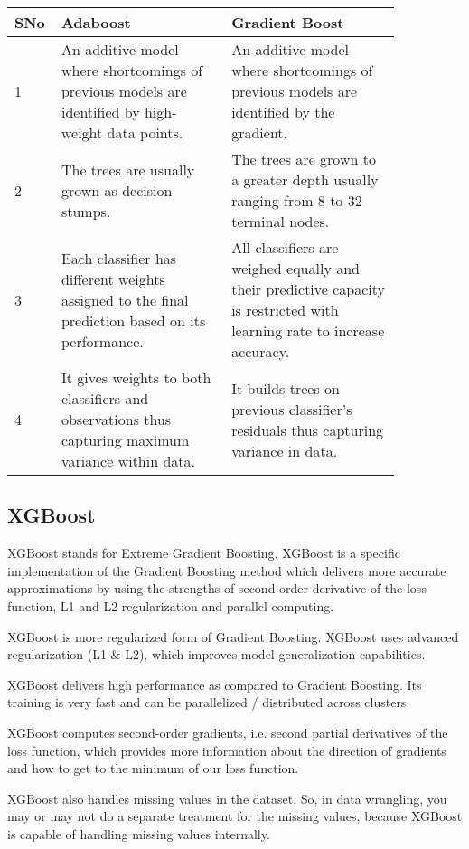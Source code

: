 \documentclass{article}
\begin{document}
\begin{table}[hbt]
\begin{tabular}{p{0.05\linewidth} | p{0.4\linewidth} | p{0.4\linewidth}}
\hline
SNo & Adaboost & Gradient Boost \\
\hline
1&  An additive model where shortcomings of previous models are identified by high-weight data points. &  An additive model where shortcomings of previous models are identified by the gradient.  \\
 2&  The trees are usually grown as decision stumps. &  The trees are grown to a greater depth usually ranging from 8 to 32 terminal nodes.  \\
 3&  Each classifier has different weights assigned to the final prediction based on its performance. &   All classifiers are weighed equally and their predictive capacity is restricted with learning rate to increase accuracy. \\
 4&  It gives weights to both classifiers and observations thus capturing maximum variance within data. &  It builds trees on previous classifier's residuals thus capturing variance in data.  \\
 \hline   
\end{tabular}
\end{table}

\subsection{XGBoost}
XGBoost stands for Extreme Gradient Boosting. XGBoost is a specific implementation of the Gradient Boosting method which delivers more accurate approximations by using the strengths of second order derivative of the loss function, L1 and L2 regularization and parallel computing. 

XGBoost is more regularized form of Gradient Boosting. XGBoost uses advanced regularization (L1 \& L2), which improves model generalization capabilities.

XGBoost delivers high performance as compared to Gradient Boosting. Its training is very fast and can be parallelized / distributed across clusters.

XGBoost computes second-order gradients, i.e. second partial derivatives of the loss function, which provides more information about the direction of gradients and how to get to the minimum of our loss function.

XGBoost also handles missing values in the dataset. So, in data wrangling, you may or may not do a separate treatment for the missing values, because XGBoost is capable of handling missing values internally.
\end{document}
